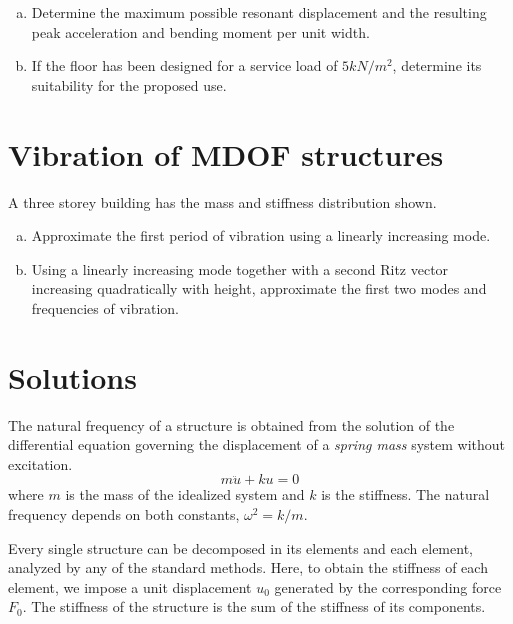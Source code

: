 \documentclass{problems}
\begin{document}
\begin{enumerate}[(a)]
    \item Determine the maximum possible resonant displacement and the resulting peak acceleration and bending moment per unit width.
    \item If the floor has been designed for a service load of $5kN/m^2$, determine its suitability for the proposed use.
\end{enumerate}

\begin{center}
\hspace{1em}
\end{center}


\section{Vibration of MDOF structures}

A three storey building has the mass and stiffness distribution shown.

\begin{enumerate}[(a)]
    \item Approximate the first period of vibration using a linearly increasing mode.
    \item Using a linearly increasing mode together with a second Ritz vector increasing quadratically with height, approximate the first two modes and frequencies of vibration.
\end{enumerate}    

\begin{center}
\end{center}

\newpage
\section{Solutions}


The natural frequency of a structure is obtained from the solution of the differential equation governing the displacement of a \emph{spring mass} system without excitation.
$$
m\ddot{u}+ku=0
$$
where $m$ is the mass of the idealized system and $k$ is the stiffness. The natural frequency depends on both constants, $\omega^2 = k/m$.

Every single structure can be decomposed in its elements and each element, analyzed by any of the standard methods. Here, to obtain the stiffness of each element, we impose a unit displacement $u_0$ generated by the corresponding force $F_0$. The stiffness of the structure is the sum of the stiffness of its components.
\end{document}
